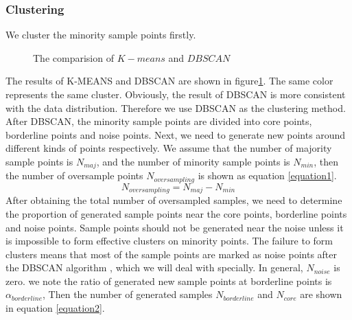 \documentclass[runningheads]{llncs}
\begin{document}
\subsubsection{Clustering}
We cluster the minority sample points firstly.
\begin{figure}[htbp]
  \centering
  \quad
  \caption{The comparision of $K-means$ and $DBSCAN$}
  \label{fig19}
  \end{figure}
The results of K-MEANS and DBSCAN are shown in figure\ref{fig19}.
The same color represents the same cluster.
Obviously, the result of DBSCAN is more consistent with the data distribution.
Therefore we use DBSCAN as the clustering method. 
After DBSCAN, 
the minority sample points are divided into core points, borderline points and noise points.
Next, we need to generate new points around different kinds of points respectively.
We assume that the number of majority sample points is $N_{maj}$,
and the number of minority sample points is $N_{min}$, then the number of oversample points $N_{oversampling}$ is shown 
as equation \ref{equation1}.
\begin{equation}
  \label{equation1}
  N_{oversampling}=N_{maj}-N_{min}
\end{equation}
After obtaining the total number of oversampled samples, 
we need to determine the proportion of generated sample points near the core points, borderline points and noise points.
Sample points should not be generated 
near the noise unless it is impossible to form effective clusters on minority points.
The failure to form clusters means that most of the sample points are marked as noise points after the DBSCAN algorithm
, which we will deal with specially.
In general, $N_{noise}$ is zero. we note the ratio of generated new sample points 
at borderline points is $\alpha_{borderline}$,
Then the number of generated samples $N_{borderline}$ and $N_{core}$ are shown in equation \ref{equation2}.
\end{document}
